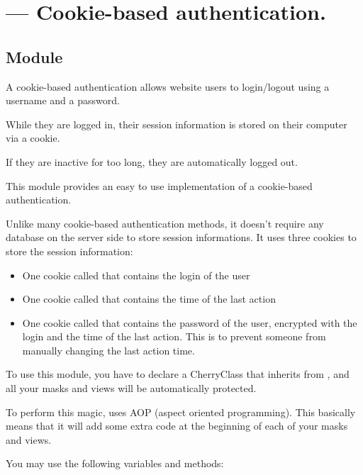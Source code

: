 \section{ --- Cookie-based authentication.}

\subsection{Module}
A cookie-based authentication allows website users to login/logout using a username and a password.

While they are logged in, their session information is stored on their computer via a cookie.

If they are inactive for too long, they are automatically logged out.

This module provides an easy to use implementation of a cookie-based authentication.

Unlike many cookie-based authentication methods, it doesn't require any database on the server side to
store session informations. It uses three cookies to store the session information:
\begin{itemize}
\item
One cookie called  that contains the login of the user
\item
One cookie called  that contains the time of the last action
\item
One cookie called  that contains the password of the user, encrypted with the login and the
time of the last action. This is to prevent someone from manually changing the last action time.
\end{itemize}

To use this module, you have to declare a CherryClass that inherits from , and all your masks
and views will be automatically protected.

To perform this magic,  uses AOP (aspect oriented programming). This basically means
that it will add some extra code at the beginning of each of your masks and views.

You may use the following variables and methods:

